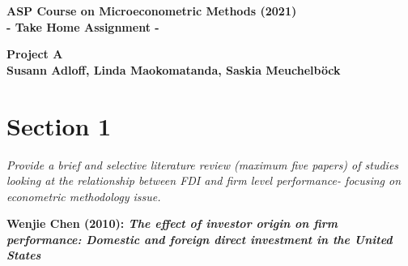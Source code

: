 \documentclass[11pt,a4paper,leqno]{article}
\begin{document}
 \begin{center}
	\begin{LARGE}
		\textbf{
			ASP Course on Microeconometric Methods (2021)\\
			 - Take Home Assignment -\\
		}
	\end{LARGE}
	\vspace{0.2cm}
	{\large \textbf{Project A}} \\\vspace{0.2cm}
	{\large \textbf{Susann Adloff, Linda Maokomatanda, Saskia Meuchelböck}} \vspace{0.2cm}
\end{center}

\section*{Section 1}
\textit{Provide a brief and selective literature review (maximum five papers) of studies looking at the relationship between FDI and firm level performance- focusing on econometric methodology issue.}\\ \vspace{0.2cm}

\noindent \textbf{Wenjie Chen (2010): \textit{The effect of investor origin on firm performance: Domestic and foreign direct
investment in the United States}}\\
\end{document}
